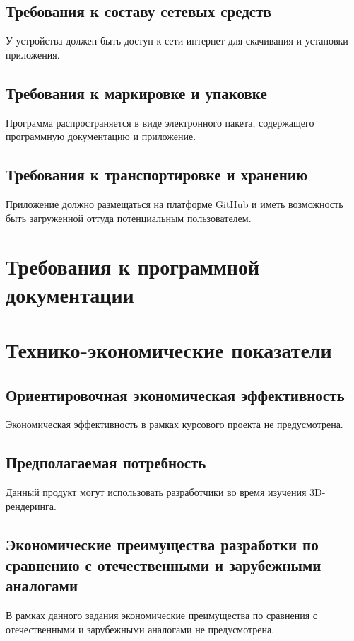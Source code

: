 \documentclass{../TechDoc}
\begin{document}
    \subsection{Требования к составу сетевых средств}
    
    У устройства должен быть доступ к сети интернет для скачивания и установки приложения.

    \subsection{Требования к маркировке и упаковке}
     Программа распространяется в виде электронного пакета, содержащего программную документацию и приложение.
    
    \subsection{Требования к транспортировке и хранению}
    Приложение должно размещаться на платформе GitHub и иметь возможность быть загруженной оттуда потенциальным пользователем.

    \section{Требования к программной документации}

    


    \section{Технико-экономические показатели}
     \subsection{Ориентировочная экономическая эффективность}
    	Экономическая эффективность в рамках курсового проекта не предусмотрена.
     \subsection{Предполагаемая потребность}
          Данный продукт могут использовать разработчики во время изучения 3D-рендеринга.
     \subsection{Экономические преимущества разработки по сравнению с отечественными и зарубежными аналогами}
          В рамках данного задания экономические преимущества по сравнения с отечественными и зарубежными аналогами не предусмотрена.
\end{document}
